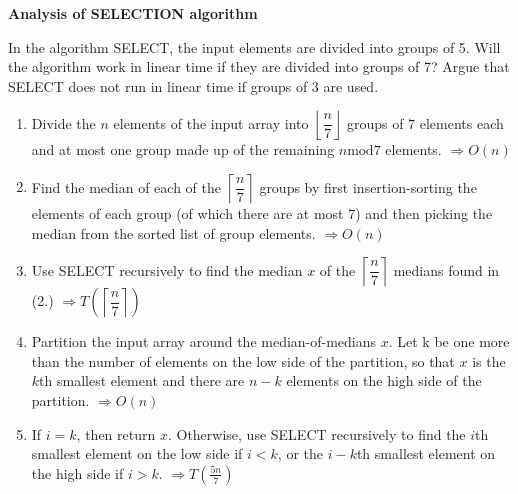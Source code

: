 \question \textbf{Analysis of SELECTION algorithm}

In the algorithm SELECT, the input elements are divided into groups of 5. Will the algorithm work in linear time if they are divided into groups of 7? Argue that SELECT does not run in linear time if groups of 3 are used.


\begin{solution}
\begin{enumerate}
\item Divide the \(n\) elements of the input array into \(\left\lfloor\dfrac{n}{7}\right\rfloor\) groups of \(7\) elements each and at most one group made up of the remaining \(n \text{mod} 7\) elements.
\(\Rightarrow O(n)\)
\item Find the median of each of the \(\left\lceil\dfrac{n}{7}\right\rceil\) groups by first insertion-sorting the elements of each group (of which there are at most \(7\)) and then picking the median from the sorted list of group elements.
\(\Rightarrow O(n)\)
\item Use SELECT recursively to find the median \(x\) of the \(\left\lceil\dfrac{n}{7}\right\rceil\) medians found in (2.)
\(\Rightarrow T(\left\lceil\dfrac{n}{7}\right\rceil)\)
\item Partition the input array around the median-of-medians \(x\). Let k be one more than the number of elements on the low side of the partition, so that \(x\) is the \(k\)th smallest element and there are \(n-k\) elements on the high side of the partition.
\(\Rightarrow O(n)\)
\item If \(i=k\), then return \(x\). Otherwise, use SELECT recursively to find the \(i\)th smallest element on the low side if \(i<k\), or the \(i-k\)th smallest element on the high side if \(i>k\).
\(\Rightarrow T(\frac{5n}{7})\)
\end{enumerate}
\end{solution}
